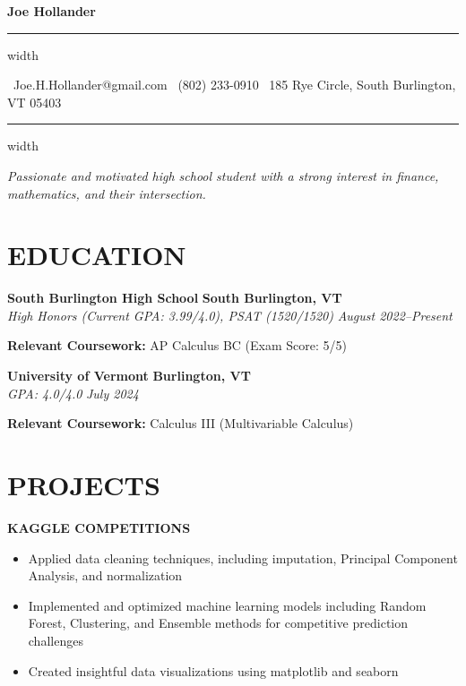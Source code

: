 \documentclass[11pt,letterpaper]{article}
\newcommand{\name}[1]{
  \begin{center}
    \Huge\textbf{\color{headingcolor}#1}
  \end{center}
  \vspace{-0.5em}
  \hrule height 0.8pt width \textwidth
  \vspace{0.5em}
}
\newcommand{\contact}[3]{
  \begin{center}
    \faEnvelope\ #1 \hspace{1em} \faPhone\ #2 \hspace{1em} \faMapMarker*\ #3
  \end{center}
  \vspace{-0.5em}
  \hrule height 0.4pt width \textwidth
  \vspace{0.5em}
}
\newcommand{\role}[4]{
  \begin{center}
  \textbf{\color{subheadingcolor}#1} \hfill \textbf{#2} \\
  \textit{#3} \hfill \textit{#4}
  \end{center}
}
\begin{document}
\name{Joe Hollander}
\vspace{-0.5em}
\contact{Joe.H.Hollander@gmail.com}{(802) 233-0910}{185 Rye Circle, South Burlington, VT 05403}

\vspace{-0.5em}
\begin{center}
\textit{Passionate and motivated high school student with a strong interest in finance, mathematics, and their intersection.}
\end{center}

\section{EDUCATION}

\vspace{0.5em}
\role{South Burlington High School}{South Burlington, VT}{High Honors (Current GPA: 3.99/4.0), PSAT (1520/1520)}{August 2022--Present}   
\begin{flushleft}
\textbf{Relevant Coursework:} AP Calculus BC (Exam Score: 5/5)
\end{flushleft}

\role{University of Vermont}{Burlington, VT}{GPA: 4.0/4.0}{July 2024}
\begin{flushleft}
\textbf{Relevant Coursework:} Calculus III (Multivariable Calculus)
\end{flushleft}

\vspace{3mm}
\section{PROJECTS}
\vspace{1em}

\begin{flushleft}
\textbf{\color{subheadingcolor}KAGGLE COMPETITIONS}
\begin{itemize}[leftmargin=*,nosep]
    \item Applied data cleaning techniques, including imputation, Principal Component Analysis, and normalization
    \item Implemented and optimized machine learning models including Random Forest, Clustering, and Ensemble methods for competitive prediction challenges
    \item Created insightful data visualizations using matplotlib and seaborn
\end{itemize}
\end{flushleft}
\end{document}
